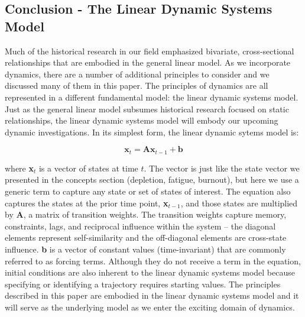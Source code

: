 \documentclass[english,,man]{apa6}
\theoremstyle{definition}
\theoremstyle{definition}
\theoremstyle{definition}
\theoremstyle{remark}
\begin{document}
\hypertarget{conclusion---the-linear-dynamic-systems-model}{%
\subsection{Conclusion - The Linear Dynamic Systems
Model}\label{conclusion---the-linear-dynamic-systems-model}}

Much of the historical research in our field emphasized bivariate,
cross-sectional relationships that are embodied in the general linear
model. As we incorporate dynamics, there are a number of additional
principles to consider and we discussed many of them in this paper. The
principles of dynamics are all represented in a different fundamental
model: the linear dynamic systems model. Just as the general linear
model subsumes historical research focused on static relationships, the
linear dynamic systems model will embody our upcoming dynamic
investigations. In its simplest form, the linear dynamic sytems model
is:

\begin{equation}
\textbf{x}_t = \textbf{A} \textbf{x}_{t-1} + \textbf{b}
\end{equation}

\noindent where \textbf{x}\(_t\) is a vector of states at time \(t\).
The vector is just like the state vector we presented in the concepts
section (depletion, fatigue, burnout), but here we use a generic term to
capture any state or set of states of interest. The equation also
captures the states at the prior time point, \textbf{x}\(_{t-1}\), and
those states are multiplied by \textbf{A}, a matrix of transition
weights. The transition weights capture memory, constraints, lags, and
reciprocal influence within the system -- the diagonal elements
represent self-similarity and the off-diagonal elements are cross-state
influence. \textbf{b} is a vector of constant values (time-invariant)
that are commonly referred to as forcing terms. Although they do not
receive a term in the equation, initial conditions are also inherent to
the linear dynamic systems model because specifying or identifying a
trajectory requires starting values. The principles described in this
paper are embodied in the linear dynamic systems model and it will serve
as the underlying model as we enter the exciting domain of dynamics.
\end{document}
